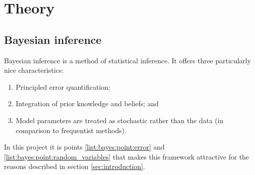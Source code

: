 \documentclass[12pt]{article} %
\begin{document}
	
	
	
	

	
	
	
%	

	\section{Theory}	
	\subsection{Bayesian inference}	
	Bayesian inference is a method of statistical inference. It offers three particularly nice characteristics:
	\begin{enumerate} \label{list:bayes}
		\item \label{list:bayes:point:error} Principled error quantification; 
		\item Integration of prior knowledge and beliefs; and
		\item \label{list:bayes:point:random_variables} Model parameters are treated as stochastic rather than the data (in comparison to frequentist methods).
	\end{enumerate}
	In this project it is points \ref{list:bayes:point:error} and \ref{list:bayes:point:random_variables} that makes this framework attractive for the reasons described in section \ref{sec:introduction}.	
	
\end{document}
